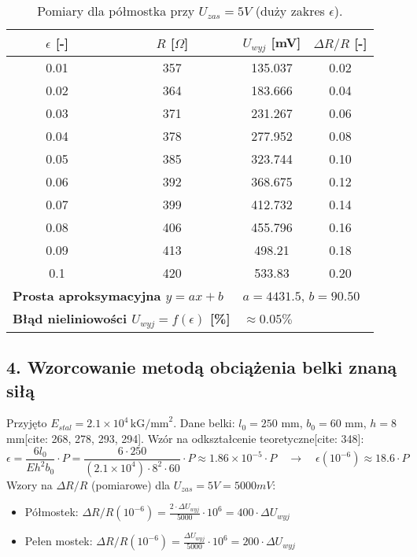 \documentclass[12pt, a4paper]{article}
\begin{document}
	\begin{table}[H]
		\centering
		\caption{Pomiary dla półmostka przy $U_{zas} = 5 V$ (duży zakres $\epsilon$).}
		\begin{tabular}{cccc}
			\toprule
			$\epsilon$ [-] & $R$ [$\Omega$] & $U_{wyj}$ [mV] & $\Delta R/R$ [-] \\
			\midrule
			0.01 & 357 & 135.037 & 0.02 \\
			0.02 & 364 & 183.666 & 0.04 \\
			0.03 & 371 & 231.267 & 0.06 \\
			0.04 & 378 & 277.952 & 0.08 \\
			0.05 & 385 & 323.744 & 0.10 \\
			0.06 & 392 & 368.675 & 0.12 \\
			0.07 & 399 & 412.732 & 0.14 \\
			0.08 & 406 & 455.796 & 0.16 \\
			0.09 & 413 & 498.21 & 0.18 \\
			0.1 & 420 & 533.83 & 0.20 \\
			\midrule
			\multicolumn{2}{l}{\textbf{Prosta aproksymacyjna $y = ax + b$}} & \multicolumn{2}{l}{$a = 4431.5$, $b = 90.50$} \\
			\multicolumn{2}{l}{\textbf{Błąd nieliniowości $U_{wyj} = f(\epsilon)$ [\%]}} & \multicolumn{2}{l}{$\approx 0.05 \%$} \\
			\bottomrule
		\end{tabular}
	\end{table}
	
	\newpage
	\subsection{4. Wzorcowanie metodą obciążenia belki znaną siłą}
	
	Przyjęto $E_{stal} = 2.1 \times 10^4 \, \text{kG/mm}^2$.  Dane belki: $l_0 = 250$ mm, $b_0 = 60$ mm, $h = 8$ mm[cite: 268, 278, 293, 294].
	 Wzór na odkształcenie teoretyczne[cite: 348]:
	$$ \epsilon = \frac{6 l_0}{E h^2 b_0} \cdot P = \frac{6 \cdot 250}{ (2.1 \times 10^4) \cdot 8^2 \cdot 60} \cdot P \approx 1.86 \times 10^{-5} \cdot P \quad \rightarrow \quad \epsilon (10^{-6}) \approx 18.6 \cdot P $$
	Wzory na $\Delta R/R$ (pomiarowe) dla $U_{zas} = 5V = 5000 mV$:
	\begin{itemize}
		\item Półmostek: $\Delta R/R (10^{-6}) = \frac{2 \cdot \Delta U_{wyj}}{5000} \cdot 10^6 = 400 \cdot \Delta U_{wyj}$
		\item Pełen mostek: $\Delta R/R (10^{-6}) = \frac{\Delta U_{wyj}}{5000} \cdot 10^6 = 200 \cdot \Delta U_{wyj}$
	\end{itemize}
	
\end{document}
